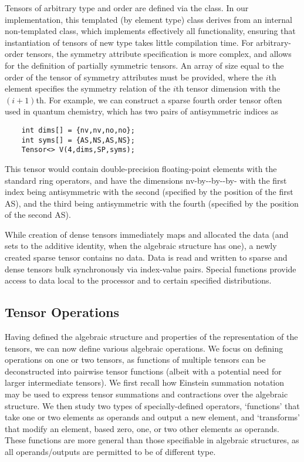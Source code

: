 Tensors of arbitrary type and order are defined via the {} class.
In our implementation, this templated (by element type) class derives from an internal non-templated class, which implements effectively all functionality, ensuring that instantiation of tensors of new type takes little compilation time.
For arbitrary-order tensors, the symmetry attribute specification is more complex, and allows for the definition of partially symmetric tensors.
An array of size equal to the order of the tensor of symmetry attributes must be provided, where the $i$th element specifies the symmetry relation of the $i$th tensor dimension with the $(i+1)$th.
For example, we can construct a sparse fourth order tensor often used in quantum chemistry, which has two pairs of antisymmetric indices as
\begin{lstlisting}
    int dims[] = {nv,nv,no,no};
    int syms[] = {AS,NS,AS,NS};
    Tensor<> V(4,dims,SP,syms);
\end{lstlisting}
This tensor would contain double-precision floating-point elements with the standard ring operators, and have the dimensions {\CD nv}-by-{}-by-{}-by-{} with the first index being antisymmetric with the second (specified by the position of the first AS), and the third being antisymmetric with the fourth (specified by the position of the second AS).

While creation of dense tensors immediately maps and allocated the data (and sets to the additive identity, when the algebraic structure has one), a newly created sparse tensor contains no data.
Data is read and written to sparse and dense tensors bulk synchronously via index-value pairs.
Special functions provide access to data local to the processor and to certain specified distributions.

\subsection{Tensor Operations}

Having defined the algebraic structure and properties of the representation of the tensors, we can now define various algebraic operations.
We focus on defining operations on one or two tensors, as functions of multiple tensors can be deconstructed into pairwise tensor functions (albeit with a potential need for larger intermediate tensors).
We first recall how Einstein summation notation may be used to express tensor summations and contractions over the algebraic structure.
We then study two types of specially-defined operators, `functions' that take one or two elements as operands and output a new element, and `transforms' that modify an element, based zero, one, or two other elements as operands.
These functions are more general than those specifiable in algebraic structures, as all operands/outputs are permitted to be of different type.

